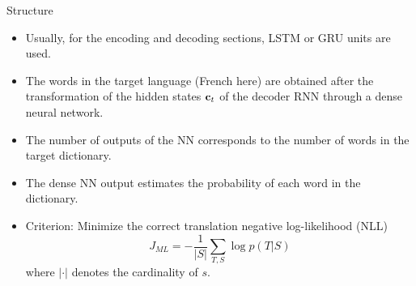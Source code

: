 \documentclass{beamer}
\begin{document}
\begin{frame}{Structure}

\begin{itemize}
\item Usually, for the encoding and decoding sections, LSTM or GRU units are used. 
\item The words in the target language (French here) are obtained after the transformation of the hidden states ${\bf c}_t$ of the decoder RNN through a dense neural network. 
\item The number of outputs of the NN corresponds to the number of words in the target dictionary.
\item The dense NN output estimates the probability of each word in the dictionary.
\item Criterion: Minimize the correct translation negative log-likelihood (NLL)
    \begin{equation}
        J_{ML} = -\frac{1}{|S|} \sum_{T,S} \log p\left(T|S\right)
    \end{equation}
    where $|\cdot|$ denotes the cardinality of $s$.
\end{itemize}
\end{frame}
\end{document}
